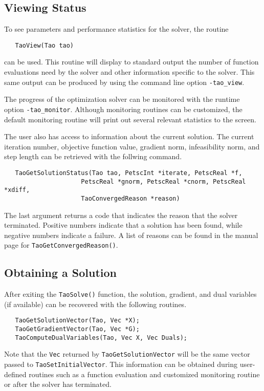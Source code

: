 \subsection{Viewing Status}

To see parameters and performance statistics for the solver, the
routine
\begin{verbatim}
   TaoView(Tao tao)
\end{verbatim}
can be used.  This routine will display to standard output the number
of function evaluations need by the solver and other information
specific to the solver.  This same output can be produced by using the 
command line option {\tt -tao\_view}.

The progress of the optimization solver can be monitored with
the runtime option {\tt -tao\_monitor}.  Although monitoring routines
can be customized, the default monitoring routine will print out 
several relevant statistics to the screen.

The user also has access to information about the current solution.
The current iteration number, objective function value, gradient
norm, infeasibility norm, and step length 
can be retrieved with the follwing command.
\begin{verbatim}
   TaoGetSolutionStatus(Tao tao, PetscInt *iterate, PetscReal *f,
                     PetscReal *gnorm, PetscReal *cnorm, PetscReal *xdiff,
                     TaoConvergedReason *reason)
\end{verbatim}
The last argument returns a code that indicates the reason that the solver 
terminated.  Positive 
numbers indicate that a solution has been found, while negative numbers
indicate a failure.  A list of reasons can be found in the manual page
for {\tt Tao\-Get\-Converged\-Reason()}.

\subsection{Obtaining a Solution}

After exiting the {\tt Tao\-Solve()} function, the solution, gradient, and 
 dual variables (if available) can be recovered 
with the following routines.
\begin{verbatim}
   TaoGetSolutionVector(Tao, Vec *X);
   TaoGetGradientVector(Tao, Vec *G);
   TaoComputeDualVariables(Tao, Vec X, Vec Duals);
\end{verbatim}
Note that the {\tt Vec} returned by {\tt TaoGetSolutionVector} will be
the same vector passed to {\tt TaoSetInitialVector}.  This information 
can be obtained during user-defined routines such as a function evaluation 
and customized monitoring routine or after the solver has terminated.




